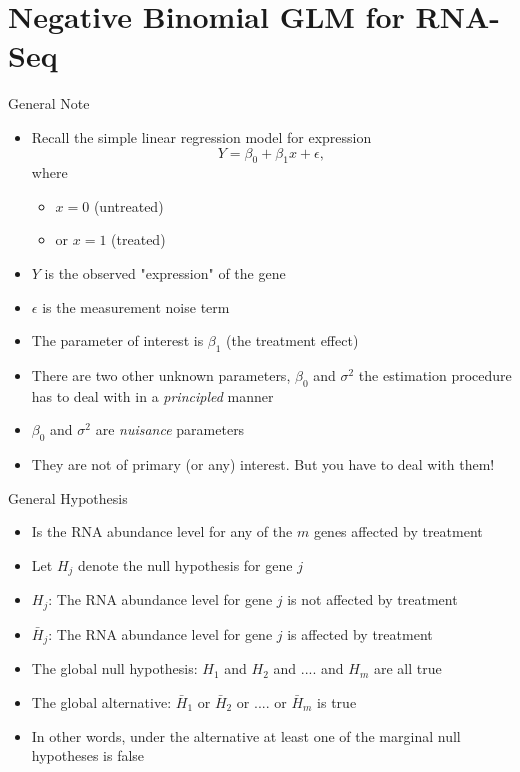 \documentclass[xcolor=x11names,compress]{beamer}\usepackage[]{graphicx}\usepackage[]{color}
\begin{document}
\section[RNA-Seq GLM]{Negative Binomial GLM for RNA-Seq}

\begin{frame}{General Note}
  \begin{itemize}
  \item Recall the simple linear regression model for expression
    \begin{equation*}
      Y=\beta_0+\beta_1 x + \epsilon,
    \end{equation*}
  where 
  \begin{itemize}
  \item   $x=0$ (untreated)
    \item or $x=1$ (treated)
  \end{itemize}
\item $Y$ is the observed "expression" of the gene
 \item $\epsilon$ is the measurement noise term
 \item The parameter of interest is $\beta_1$ (the treatment effect)
 \item There are two other unknown parameters, $\beta_0$ and $\sigma^2$
  the estimation procedure has to deal with in a {\it principled} manner
\item $\beta_0$ and $\sigma^2$ are {\it nuisance} parameters
\item They are not of primary (or any) interest. But you have to deal with them!
  \end{itemize}
\end{frame}



\begin{frame}{General Hypothesis}
  \begin{itemize}
  \item Is the RNA abundance level for any of the $m$ genes affected by treatment
  \item Let $H_j$ denote the null hypothesis for gene $j$
  \item $H_j$: The  RNA abundance level for gene $j$ is not affected by treatment
  \item $\bar{H}_j$: The  RNA abundance level for gene $j$ is affected by treatment
  \item The global null hypothesis: $H_1$ and $H_2$ and .... and $H_m$ are all true
  \item The global alternative: $\bar{H}_1$ or $\bar{H}_2$ or .... or $\bar{H}_m$ is true
  \item In other words, under the alternative at least one of the marginal null hypotheses is false
  \end{itemize}
\end{frame}
\end{document}
